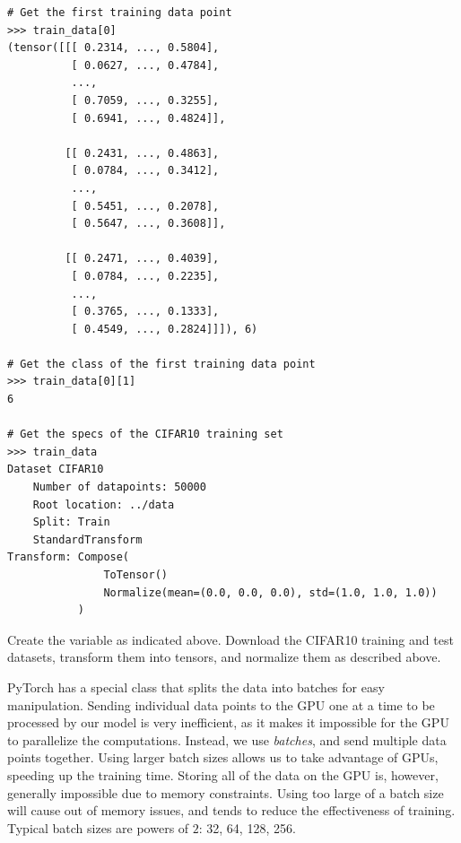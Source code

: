 \begin{lstlisting}           
# Get the first training data point
>>> train_data[0]
(tensor([[[ 0.2314, ..., 0.5804],
          [ 0.0627, ..., 0.4784],
          ...,
          [ 0.7059, ..., 0.3255],
          [ 0.6941, ..., 0.4824]],
 
         [[ 0.2431, ..., 0.4863],
          [ 0.0784, ..., 0.3412],
          ...,
          [ 0.5451, ..., 0.2078],
          [ 0.5647, ..., 0.3608]],
 
         [[ 0.2471, ..., 0.4039],
          [ 0.0784, ..., 0.2235],
          ...,
          [ 0.3765, ..., 0.1333],
          [ 0.4549, ..., 0.2824]]]), 6)

# Get the class of the first training data point
>>> train_data[0][1]
6

# Get the specs of the CIFAR10 training set
>>> train_data
Dataset CIFAR10
    Number of datapoints: 50000
    Root location: ../data
    Split: Train
    StandardTransform
Transform: Compose(
               ToTensor()
               Normalize(mean=(0.0, 0.0, 0.0), std=(1.0, 1.0, 1.0))
           )
\end{lstlisting}

\begin{problem}
Create the  variable as indicated above.
Download the CIFAR10 training and test datasets, transform them into tensors, and normalize them as described above.
\end{problem}

PyTorch has a special class  that splits the data into batches for easy manipulation.
Sending individual data points to the GPU one at a time to be processed by our model is very inefficient, as it makes it impossible for the GPU to parallelize the computations.
Instead, we use \emph{batches}, and send multiple data points together.
Using larger batch sizes allows us to take advantage of GPUs, speeding up the training time.
Storing all of the data on the GPU is, however, generally impossible due to memory constraints.
Using too large of a batch size will cause out of memory issues, and tends to reduce the effectiveness of training.
Typical batch sizes are powers of $2$: 32, 64, 128, 256.


